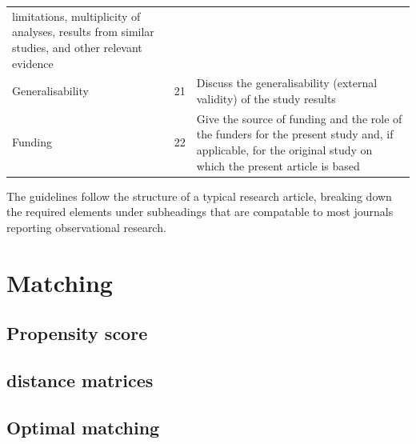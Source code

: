 \documentclass[]{book}
\begin{document}
\begin{longtable}[]{@{}lll@{}}
\begin{minipage}[t]{0.40\columnwidth}
limitations, multiplicity of
analyses, results from similar
studies, and other relevant
evidence\strut
\end{minipage}\tabularnewline
\begin{minipage}[t]{0.34\columnwidth}\raggedright
Generalisability\strut
\end{minipage} & \begin{minipage}[t]{0.17\columnwidth}\raggedright
21\strut
\end{minipage} & \begin{minipage}[t]{0.40\columnwidth}\raggedright
Discuss the generalisability
(external validity) of the
study results\strut
\end{minipage}\tabularnewline
\begin{minipage}[t]{0.34\columnwidth}\raggedright
Funding\strut
\end{minipage} & \begin{minipage}[t]{0.17\columnwidth}\raggedright
22\strut
\end{minipage} & \begin{minipage}[t]{0.40\columnwidth}\raggedright
Give the source of funding and
the role of the funders for
the present study and, if
applicable, for the original
study on which the present
article is based\strut
\end{minipage}\tabularnewline
\bottomrule
\end{longtable}

The guidelines follow the structure of a typical research article, breaking down the required elements under subheadings that are compatable to most journals reporting observational research.

\hypertarget{matching}{%
\section{Matching}\label{matching}}

\hypertarget{propensity-score}{%
\subsection{Propensity score}\label{propensity-score}}

\hypertarget{distance-matrices}{%
\subsection{distance matrices}\label{distance-matrices}}

\hypertarget{optimal-matching}{%
\subsection{Optimal matching}\label{optimal-matching}}
\end{document}
